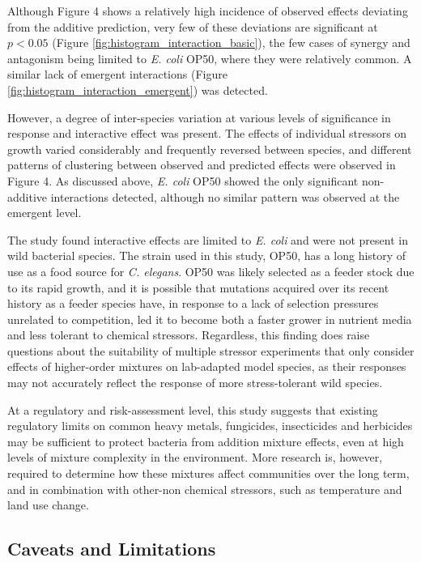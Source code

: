 \documentclass[10pt]{article}
\begin{document}
Although Figure 4 shows a relatively high incidence of observed effects deviating from the additive prediction, very few of these deviations are significant at $p < 0.05$ (Figure \ref{fig:histogram_interaction_basic}), the few cases of synergy and antagonism being limited to \textit{E. coli} OP50, where they were relatively common. A similar lack of emergent interactions (Figure \ref{fig:histogram_interaction_emergent}) was detected. 

However, a degree of inter-species variation at various levels of significance in response and interactive effect was present. The effects of individual stressors on growth varied considerably and frequently reversed between species, and different patterns of clustering between observed and predicted effects were observed in Figure 4. As discussed above, \textit{E. coli} OP50 showed the only significant non-additive interactions detected, although no similar pattern was observed at the emergent level. 

The study found interactive effects are limited to \textit{E. coli} and were not present in wild bacterial species. The strain used in this study, OP50, has a long history of use as a food source for \textit{C. elegans}. OP50 was likely selected as a feeder stock due to its rapid growth, and it is possible that mutations acquired over its recent history as a feeder species \cite{Tenaillon2016} have, in response to a lack of selection pressures unrelated to competition, led it to become both a faster grower in nutrient media and less tolerant to chemical stressors. Regardless, this finding does raise questions about the suitability of multiple stressor experiments that only consider effects of higher-order mixtures on lab-adapted model species, as their responses may not accurately reflect the response of more stress-tolerant wild species.  

At a regulatory and risk-assessment level, this study suggests that existing regulatory limits on common heavy metals, fungicides, insecticides and herbicides may be sufficient to protect bacteria from addition mixture effects, even at high levels of mixture complexity in the environment. More research is, however, required to determine how these mixtures affect communities over the long term, and in combination with other-non chemical stressors, such as temperature and land use change.  

\subsection{Caveats and Limitations}
\label{S:4:3}
\end{document}

